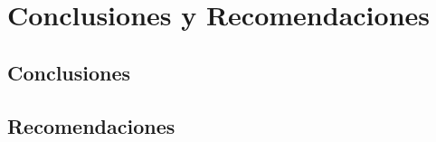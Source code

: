 \documentclass[12pt,letterpaper,spanish,twoside,openright]{report}
\begin{document}
\chapter{Conclusiones y Recomendaciones}

\section{Conclusiones}

\section{Recomendaciones}

\end{document}
